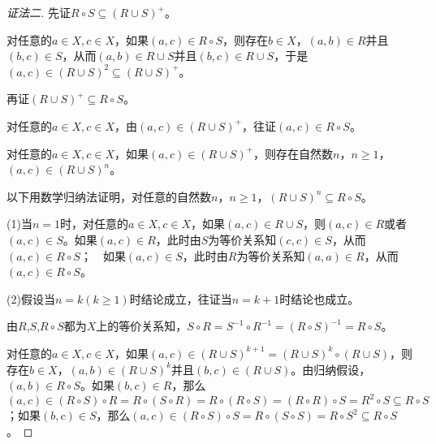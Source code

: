 \documentclass{article}
\begin{document}
\begin{CJK*}{UTF8}{gbsn}
      \begin{proof}[证法二]
        先证$R\circ S\subseteq (R\cup S)^+$。
      
        对任意的$a\in X,c\in X$，如果$(a,c)\in R\circ S$，则存在$b\in X$，$(a,b)\in R$并且$(b,c)\in S$，从而$(a,b)\in R\cup S$并且$(b,c)\in R\cup S$，于是$(a,c)\in (R\cup S)^2 \subseteq (R\cup S)^+$。
      
        再证$(R\cup S)^+\subseteq R\circ S$。
      
        对任意的$a\in X,c\in X$，由$(a,c)\in (R\cup S)^+$，往证$(a,c)\in R\circ S$。
      
        对任意的$a\in X,c\in X$，如果$(a,c)\in (R\cup S)^+$，则存在自然数$n$，$n\geq 1$，　$(a,c)\in (R\cup S)^n$。
      
        以下用数学归纳法证明，对任意的自然数$n$，$n\geq 1$，$(R\cup S)^n\subseteq R\circ S$。
      
        (1)当$n=1$时，对任意的$a\in X,c\in X$，如果$(a,c)\in R\cup S$，则$(a,c)\in R$或者$(a,c)\in S$。如果$(a,c)\in R$，此时由$S$为等价关系知$(c,c)\in S$，从而$(a,c)\in R\circ S$；　如果$(a,c)\in S$，此时由$R$为等价关系知$(a,a)\in R$，从而$(a,c)\in R\circ S$。
      
        (2)假设当$n=k(k\geq 1)$时结论成立，往证当$n=k+1$时结论也成立。
      
        由$R$,$S$,$R\circ S$都为$X$上的等价关系知，$S\circ R=S^{-1}\circ R^{-1}=(R\circ S)^{-1}=R\circ S$。
      
        对任意的$a\in X,c\in X$，如果$(a,c)\in (R\cup S)^{k+1}=(R\cup S)^k\circ (R\cup S)$，则存在$b\in X$，$(a,b)\in (R\cup S)^k$并且$(b,c)\in (R\cup S)$。由归纳假设，$(a,b)\in R\circ S$。如果$(b,c)\in R$，那么$(a,c)\in (R\circ S)\circ R = R\circ (S\circ R) = R\circ (R\circ S) = (R\circ R)\circ S = R^2\circ S \subseteq R\circ S$；如果$(b,c)\in S$，那么$(a,c)\in (R\circ S)\circ S = R\circ (S\circ S) = R\circ S^2 \subseteq R\circ S$。
        
      
        
      \end{proof}
      
   


      \chapter{}

\end{CJK*}
\end{document}
